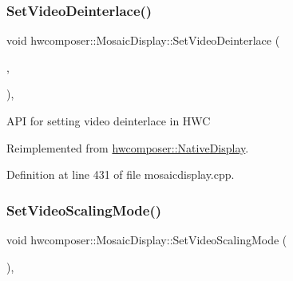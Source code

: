 \subsubsection{\texorpdfstring{Set\+Video\+Deinterlace()}{SetVideoDeinterlace()}}
{\footnotesize\ttfamily void hwcomposer\+::\+Mosaic\+Display\+::\+Set\+Video\+Deinterlace (\begin{DoxyParamCaption}\item[{H\+W\+C\+Deinterlace\+Flag}]{,  }\item[{H\+W\+C\+Deinterlace\+Control}]{ }\end{DoxyParamCaption})\hspace{0.3cm}{\ttfamily [override]}, {\ttfamily [virtual]}}

A\+PI for setting video deinterlace in H\+WC 

Reimplemented from \mbox{\hyperlink{classhwcomposer_1_1NativeDisplay_ae0c6d8eebaae9cdacd1e4bfba84585bf}{hwcomposer\+::\+Native\+Display}}.



Definition at line 431 of file mosaicdisplay.\+cpp.


\begin{DoxyCode}{0}
\end{DoxyCode}
\mbox{\label{classhwcomposer_1_1MosaicDisplay_ac634db4100aa1707f28ff2bbb77b8460}} 
\subsubsection{\texorpdfstring{Set\+Video\+Scaling\+Mode()}{SetVideoScalingMode()}}
{\footnotesize\ttfamily void hwcomposer\+::\+Mosaic\+Display\+::\+Set\+Video\+Scaling\+Mode (\begin{DoxyParamCaption}\item[{uint32\+\_\+t}]{ }\end{DoxyParamCaption})\hspace{0.3cm}{\ttfamily [override]}, {\ttfamily [virtual]}}

